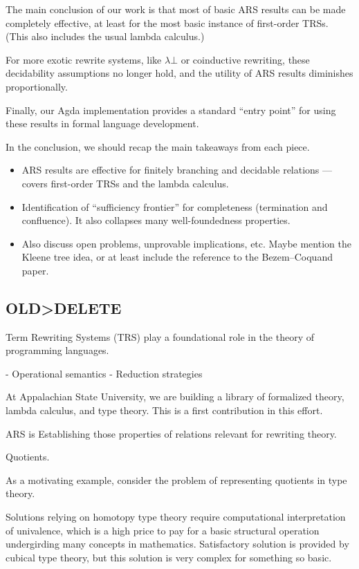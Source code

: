The main conclusion of our work is that most of basic ARS results can be made completely effective, at least for the most basic instance of first-order TRSs.
(This also includes the usual lambda calculus.)

For more exotic rewrite systems, like $\lambda \bot$ or coinductive rewriting,
these decidability assumptions no longer hold, and the utility of ARS results diminishes proportionally.

Finally, our Agda implementation provides a standard ``entry point'' for using these results in formal language development.

{ \color{gray}
In the conclusion, we should recap the main takeaways from each piece.
\begin{itemize}
  \item ARS results are effective for finitely branching and decidable relations
  --- covers first-order TRSs and the lambda calculus.
  \item Identification of ``sufficiency frontier'' for completeness (termination and confluence).
  It also collapses many well-foundedness properties.
  \item Also discuss open problems, unprovable implications, etc.
  Maybe mention the Kleene tree idea, or at least include the reference to the Bezem--Coquand paper.
\end{itemize}
}


\subsection{OLD>DELETE}

Term Rewriting Systems (TRS) play a foundational role in the theory of
programming languages.

- Operational semantics
- Reduction strategies

At Appalachian State University, we are building a library of formalized theory,
lambda calculus, and type theory. This is a first contribution in this effort.

ARS is Establishing those properties of relations relevant for rewriting theory.

Quotients.

As a motivating example, consider the problem of representing quotients in type theory.

Solutions relying on homotopy type theory require computational interpretation
of univalence, which is a high price to pay for a basic structural operation
undergirding many concepts in mathematics.
Satisfactory solution is provided by cubical type theory, but this solution
is very complex for something so basic.

